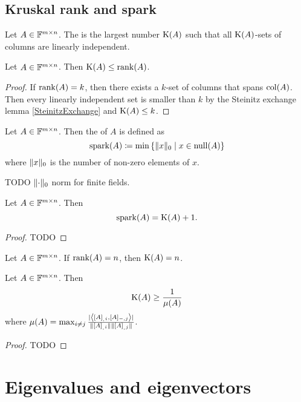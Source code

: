 \subsection{Kruskal rank and spark}
\begin{definition}
Let $A\in \mathbb{F}^{m\times n}$. The  is the largest number $\operatorname{K}(A)$ such that all $\operatorname{K}(A)$-sets of columns are linearly independent.
\end{definition}
\begin{lemma}
Let $A\in \mathbb{F}^{m\times n}$. Then $\operatorname{K}(A) \leq \operatorname{rank}(A)$.
\end{lemma}
\begin{proof}
If $\operatorname{rank}(A) = k$, then there exists a $k$-set of columns that spans $\operatorname{col}(A)$. Then every linearly independent set is smaller than $k$ by the Steinitz exchange lemma \ref{SteinitzExchange} and $\operatorname{K}(A) \leq k$.
\end{proof}

\begin{definition}
Let $A\in \mathbb{F}^{m\times n}$. Then the  of $A$ is defined as
\[ \operatorname{spark}(A) \defeq \min\setbuilder{\norm{x}_0}{x\in\Null(A)} \]
where $\lVert x\rVert_0$ is the number of non-zero elements of $x$.
\end{definition}
TODO $\lVert\cdot\rVert_0$ norm for finite fields.

\begin{lemma}
Let $A\in \mathbb{F}^{m\times n}$. Then
\[ \operatorname{spark}(A) = \operatorname{K}(A) + 1. \]
\end{lemma}
\begin{proof}
TODO
\end{proof}

\begin{lemma}
Let $A\in \mathbb{F}^{m\times n}$. If $\operatorname{rank}(A) = n$, then $\operatorname{K}(A) = n$.
\end{lemma}

\begin{proposition}
Let $A\in \mathbb{F}^{m\times n}$. Then
\[ \operatorname{K}(A) \geq \frac{1}{\mu(A)} \]
where $\mu(A) = \max_{i\neq j} \frac{|\inner{[A]_{_,i},[A]_{-,j}}|}{\norm{[A]_{_,i}}\norm{[A]_{_,j}}}$.
\end{proposition}
\begin{proof}
TODO
\end{proof}


\section{Eigenvalues and eigenvectors}
